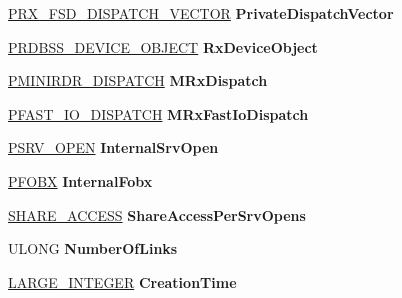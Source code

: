 \begin{DoxyCompactItemize}
\item 
\mbox{\label{struct___f_c_b_a517464cfd6c6174102f1322a91866fb5}} 
\hyperlink{struct___r_x___f_s_d___d_i_s_p_a_t_c_h___v_e_c_t_o_r}{P\+R\+X\+\_\+\+F\+S\+D\+\_\+\+D\+I\+S\+P\+A\+T\+C\+H\+\_\+\+V\+E\+C\+T\+OR} {\bfseries Private\+Dispatch\+Vector}
\item 
\mbox{\label{struct___f_c_b_aba131d6e464eecf135ccf4b293565110}} 
\hyperlink{struct___r_d_b_s_s___d_e_v_i_c_e___o_b_j_e_c_t}{P\+R\+D\+B\+S\+S\+\_\+\+D\+E\+V\+I\+C\+E\+\_\+\+O\+B\+J\+E\+CT} {\bfseries Rx\+Device\+Object}
\item 
\mbox{\label{struct___f_c_b_a6c795d8086c98075ec8b6a747c6b5ea2}} 
\hyperlink{struct___m_i_n_i_r_d_r___d_i_s_p_a_t_c_h}{P\+M\+I\+N\+I\+R\+D\+R\+\_\+\+D\+I\+S\+P\+A\+T\+CH} {\bfseries M\+Rx\+Dispatch}
\item 
\mbox{\label{struct___f_c_b_a7e45ab78d98faab7666d1ee53dfef4f8}} 
\hyperlink{struct___f_a_s_t___i_o___d_i_s_p_a_t_c_h}{P\+F\+A\+S\+T\+\_\+\+I\+O\+\_\+\+D\+I\+S\+P\+A\+T\+CH} {\bfseries M\+Rx\+Fast\+Io\+Dispatch}
\item 
\mbox{\label{struct___f_c_b_a4985ebb201b3450aeac01802271a98c6}} 
\hyperlink{struct___s_r_v___o_p_e_n}{P\+S\+R\+V\+\_\+\+O\+P\+EN} {\bfseries Internal\+Srv\+Open}
\item 
\mbox{\label{struct___f_c_b_aabbbe940f20ea6c768d006f95e1ccaf1}} 
\hyperlink{struct___f_o_b_x}{P\+F\+O\+BX} {\bfseries Internal\+Fobx}
\item 
\mbox{\label{struct___f_c_b_ae22319568bdcd0f413b7474eedaa0724}} 
\hyperlink{struct___s_h_a_r_e___a_c_c_e_s_s}{S\+H\+A\+R\+E\+\_\+\+A\+C\+C\+E\+SS} {\bfseries Share\+Access\+Per\+Srv\+Opens}
\item 
\mbox{\label{struct___f_c_b_a33409b6934f6bb6191ee76f459ee80b7}} 
U\+L\+O\+NG {\bfseries Number\+Of\+Links}
\item 
\mbox{\label{struct___f_c_b_a19f8cc3fbd69b3c6aca741868f1daa77}} 
\hyperlink{union___l_a_r_g_e___i_n_t_e_g_e_r}{L\+A\+R\+G\+E\+\_\+\+I\+N\+T\+E\+G\+ER} {\bfseries Creation\+Time}

\end{DoxyCompactItemize}
